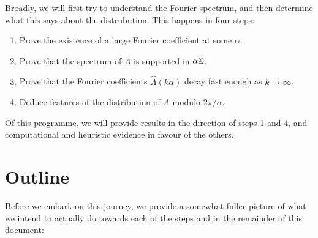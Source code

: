 \documentclass{report}
\theoremstyle{remark}
\numberwithin{equation}{section}
\begin{document}
Broadly, we will first try to understand the Fourier spectrum, and
then determine what this says about the distrubution.  This happens in
four steps:

\begin{enumerate}
  \item Prove the existence of a large Fourier coefficient at
    some $\alpha$.
  \item Prove that the spectrum of $A$ is supported in $\alpha \mathbb{Z}$.  
  \item Prove that the Fourier coefficients $\widehat{A}(k\alpha)$
    decay fast enough as $k \to \infty$.  
  \item Deduce features of the distribution of $A$ modulo
    $2\pi/\alpha$.
\end{enumerate}

Of this programme, we will provide results in the direction of steps 1
and 4, and computational and heuristic evidence in favour of the
others.

\section{Outline}

Before we embark on this journey, we provide a somewhat fuller picture
of what we intend to actually do towards each of the steps and in the
remainder of this document:
\end{document}
